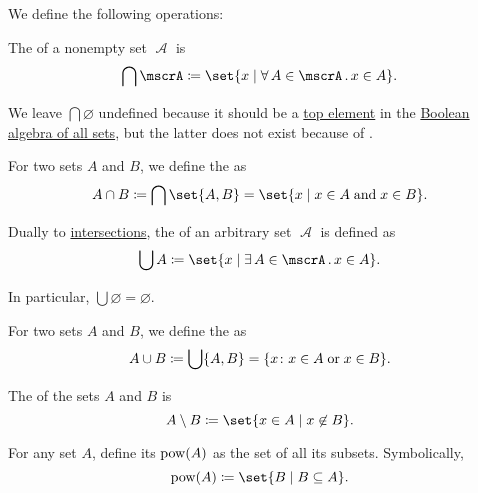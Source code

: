 \begin{definition}\label{def:basic_set_operations}
  We define the following operations:

  \begin{thmenum}
     The  of a nonempty set \( \mscrA \) is
    \begin{equation*}
      \bigcap \mscrA \coloneqq \set{ x \given \qforall {A \in \mscrA} x \in A }.
    \end{equation*}

    We leave \( \bigcap \varnothing \) undefined because it should be a \hyperref[def:poset_extremal_points/top_and_bottom]{top element} in the \hyperref[thm:boolean_algebra_of_subsets]{Boolean algebra of all sets}, but the latter does not exist because of .

    For two sets \( A \) and \( B \), we define the  as
    \begin{equation*}
      A \cap B \coloneqq \bigcap \set{ A, B } = \set{ x \given x \in A \T{and} x \in B }.
    \end{equation*}

     Dually to \hyperref[def:basic_set_operations/intersection]{intersections}, the  of an arbitrary set \( \mscrA \) is defined as
    \begin{equation*}
      \bigcup A \coloneqq \set{ x \given \qexists {A \in \mscrA} x \in A }.
    \end{equation*}

    In particular, \( \bigcup \varnothing = \varnothing \).

    For two sets \( A \) and \( B \), we define the  as
    \begin{equation*}
      A \cup B \coloneqq \bigcup \{ A, B \} = \{ x \colon x \in A \T{or} x \in B \}.
    \end{equation*}

     The  of the sets \( A \) and \( B \) is
    \begin{equation*}
      A \setminus B \coloneqq \set{ x \in A \given x \not\in B }.
    \end{equation*}

     For any set \( A \), define its  \( \operatorname{pow}(A) \) as the set of all its subsets. Symbolically,
    \begin{equation*}
      \pow(A) \coloneqq \set{ B \given B \subseteq A }.
    \end{equation*}
  \end{thmenum}
\end{definition}

